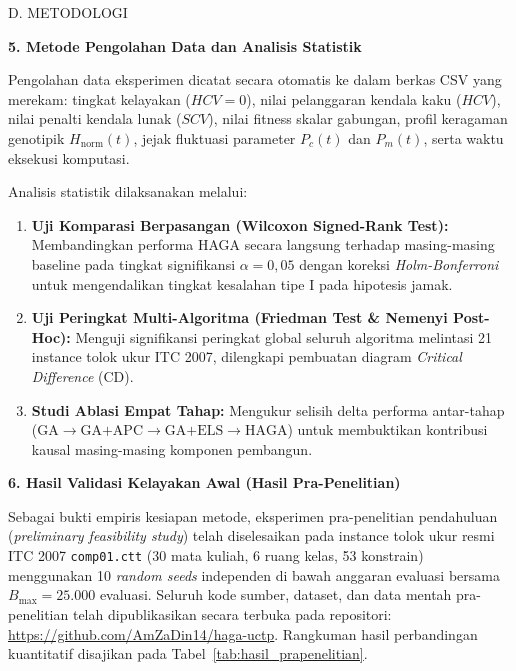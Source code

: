 \documentclass[letterpaper,12pt,oneside]{article}
\newcommand{\subheading}[2]{%
  \par\vspace{0.8em}\noindent
  \textbf{#1. #2}\par\vspace{0.3em}
}
\begin{document}
\begin{wordsection}{D. METODOLOGI}
\subheading{5}{Metode Pengolahan Data dan Analisis Statistik}

Pengolahan data eksperimen dicatat secara otomatis ke dalam berkas CSV yang merekam: tingkat kelayakan ($HCV=0$), nilai pelanggaran kendala kaku ($HCV$), nilai penalti kendala lunak ($SCV$), nilai fitness skalar gabungan, profil keragaman genotipik $H_{\text{norm}}(t)$, jejak fluktuasi parameter $P_c(t)$ dan $P_m(t)$, serta waktu eksekusi komputasi.

Analisis statistik dilaksanakan melalui:
\begin{enumerate}
    \item \textbf{Uji Komparasi Berpasangan (Wilcoxon Signed-Rank Test):} Membandingkan performa HAGA secara langsung terhadap masing-masing baseline pada tingkat signifikansi $\alpha = 0{,}05$ dengan koreksi \textit{Holm-Bonferroni} untuk mengendalikan tingkat kesalahan tipe I pada hipotesis jamak.
    \item \textbf{Uji Peringkat Multi-Algoritma (Friedman Test \& Nemenyi Post-Hoc):} Menguji signifikansi peringkat global seluruh algoritma melintasi 21 instance tolok ukur ITC 2007, dilengkapi pembuatan diagram \textit{Critical Difference} (CD).
    \item \textbf{Studi Ablasi Empat Tahap:} Mengukur selisih delta performa antar-tahap ($\text{GA} \to \text{GA+APC} \to \text{GA+ELS} \to \text{HAGA}$) untuk membuktikan kontribusi kausal masing-masing komponen pembangun.
\end{enumerate}

\subheading{6}{Hasil Validasi Kelayakan Awal (Hasil Pra-Penelitian)}

Sebagai bukti empiris kesiapan metode, eksperimen pra-penelitian pendahuluan (\textit{preliminary feasibility study}) telah diselesaikan pada instance tolok ukur resmi ITC 2007 \texttt{comp01.ctt} (30 mata kuliah, 6 ruang kelas, 53 konstrain) menggunakan 10 \textit{random seeds} independen di bawah anggaran evaluasi bersama $B_{\max} = 25.000$ evaluasi. Seluruh kode sumber, dataset, dan data mentah pra-penelitian telah dipublikasikan secara terbuka pada repositori: \url{https://github.com/AmZaDin14/haga-uctp}. Rangkuman hasil perbandingan kuantitatif disajikan pada Tabel~\ref{tab:hasil_prapenelitian}.


\end{wordsection}
\end{document}
